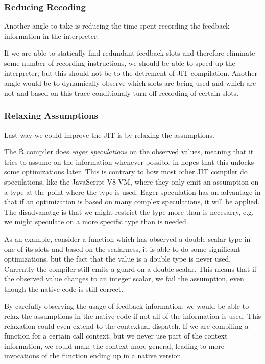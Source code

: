 \subsubsection*{Reducing Recoding}

Another angle to take is reducing the time spent recording the feedback information in the interpreter.

If we are able to statically find redundant feedback slots and therefore eliminate some number of recording instructions, we should be able to speed up the interpreter, but this should not be to the detrement of JIT compilation. Another angle would be to dynamically observe which slots are being used and which are not and based on this trace conditionaly turn off recording of certain slots.

\subsubsection*{Relaxing Assumptions}

Last way we could improve the JIT is by relaxing the assumptions.

The Ř compiler does \textit{eager speculations} on the observed values, meaning that it tries to assume on the information whenever possible in hopes that this unlocks some optimizations later. This is contrary to how most other JIT compiler do speculations, like the JavaScript V8 VM\todocite, where they only emit an assumption on a type at the point where the type is used. Eager speculation has an advantage in that if an optimization is based on many complex speculations, it will be applied. The disadvanatge is that we might restrict the type more than is necesarry, e.g. we might speculate on a more specific type than is needed.

As an example, consider a function which has observed a double scalar type in one of its slots and based on the scalarness, it is able to do some significant optimizations, but the fact that the value is a double type is never used. Currently the compiler still emits a guard on a double scalar. This means that if the observed value changes to an integer scalar, we fail the assumption, even though the native code is still correct.

By carefully observing the usage of feedback information, we would be able to relax the assumptions in the native code if not all of the information is used. This relaxation could even extend to the contextual dispatch. If we are compiling a function for a certain call context, but we never use part of the context information, we could make the context more general, leading to more invocations of the function ending up in a native version.

